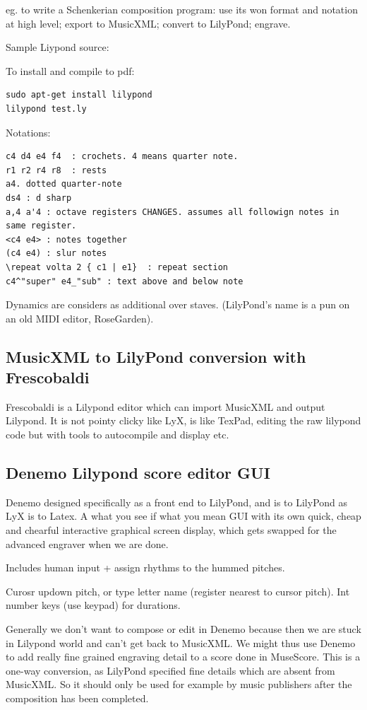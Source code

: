 \documentclass[oneside,english]{scrbook}
\begin{document}
eg. to write a Schenkerian composition program: use its won format and notation at high level; export to MusicXML; convert to LilyPond; engrave.

Sample Liypond source:


To install and compile to pdf:

\begin{lstlisting}
sudo apt-get install lilypond
lilypond test.ly
\end{lstlisting}

Notations:
\begin{lstlisting}
c4 d4 e4 f4  : crochets. 4 means quarter note.
r1 r2 r4 r8  : rests
a4. dotted quarter-note
ds4 : d sharp
a,4 a'4 : octave registers CHANGES. assumes all followign notes in same register.
<c4 e4> : notes together
(c4 e4) : slur notes
\repeat volta 2 { c1 | e1}  : repeat section
c4^"super" e4_"sub" : text above and below note 
\end{lstlisting}

Dynamics are considers as additional over staves.  (LilyPond's name is a pun on an old MIDI editor, RoseGarden).

\subsection{MusicXML to LilyPond conversion with Frescobaldi}

Frescobaldi is a Lilypond editor which can import MusicXML and output Lilypond.
It is not pointy clicky like LyX, is like TexPad, editing the raw lilypond code but with tools to autocompile and display etc.

\subsection{Denemo Lilypond score editor GUI}
Denemo designed specifically as a front end to LilyPond, and is to LilyPond as LyX is to Latex.  A what you see if what you mean GUI with its own quick, cheap and chearful interactive graphical screen display, which gets swapped for the advanced engraver when we are done.

Includes human input + assign rhythms to the hummed pitches.

Curosr updown pitch, or type letter name (register nearest to cursor pitch).  Int number keys (use keypad) for durations.

Generally we don't want to compose or edit in Denemo because then we are stuck in Lilypond world and can't get back to MusicXML.  We might thus use Denemo to add really fine grained engraving detail to a score done in MuseScore.  This is a one-way conversion, as LilyPond specified fine details which are absent from MusicXML.   So it should only be used for example by music publishers after the composition has been completed.
\end{document}
